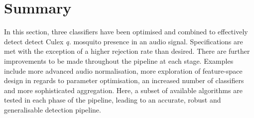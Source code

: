 \section{Summary}
\label{sec:exp-summary}
    In this section, three classifiers have been optimised and combined to effectively detect detect Culex \textit{q.} mosquito presence in an audio signal. Specifications are met with the exception of a higher rejection rate than desired. There are further improvements to be made throughout the pipeline at each stage. Examples include more advanced audio normalisation, more exploration of feature-space design in regards to parameter optimisation, an increased number of classifiers and more sophisticated aggregation. Here, a subset of available algorithms are tested in each phase of the pipeline, leading to an accurate, robust and generalisable detection pipeline.
    
    